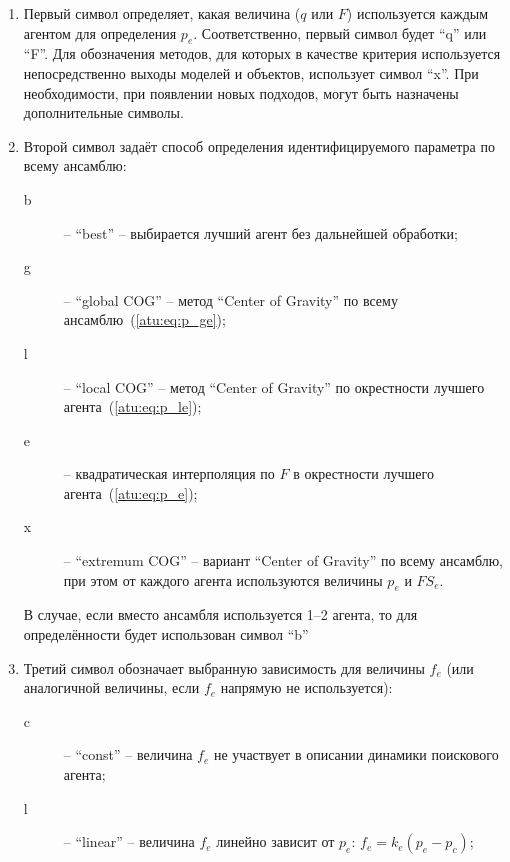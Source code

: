 \begin{enumerate}

  \item  Первый символ определяет, какая величина ($q$ или $F$) используется
    каждым агентом для определения $p_e$. Соответственно, первый символ
    будет ``q'' или ``F''.
    Для обозначения методов, для которых в качестве критерия используется
    непосредственно выходы моделей и объектов, использует символ ``x''.
    При необходимости, при появлении новых подходов,
    могут быть назначены дополнительные символы.

  \item
    Второй символ задаёт способ определения идентифицируемого параметра по всему ансамблю:
    \begin{description}

      \item[b]  -- ``best'' -- выбирается лучший агент без дальнейшей обработки;

      \item[g]  -- ``global COG'' -- метод ``Center of Gravity'' по всему ансамблю~(\ref{atu:eq:p_ge});

      \item[l] -- ``local COG'' --   метод ``Center of Gravity'' по окрестности лучшего агента~(\ref{atu:eq:p_le});

      \item[e] -- квадратическая интерполяция по $F$ в окрестности лучшего агента~(\ref{atu:eq:p_e});

      \item[x] -- ``extremum COG'' -- вариант ``Center of Gravity'' по всему ансамблю, при этом
        от каждого агента используются величины $p_e$ и $FS_e$.

    \end{description}

    В случае, если вместо ансамбля используется 1--2 агента, то для определённости будет
    использован символ ``b''

  \item
    Третий символ обозначает выбранную зависимость для величины $f_e$ (или аналогичной величины, если $f_e$ напрямую не используется):
    \begin{description}

      \item[c]  -- ``const'' -- величина $f_e$ не участвует в описании
        динамики поискового агента;

      \item[l] -- ``linear'' --  величина $f_e$ линейно зависит
        от $p_e$: $f_e = k_e ( p_e - p_c )$;


\end{description}
\end{enumerate}
